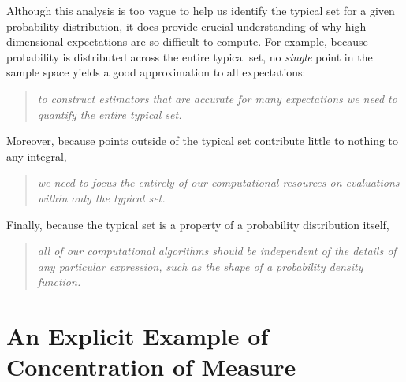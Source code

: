 Although this analysis is too vague to help us identify the typical set
for a given probability distribution, it does provide crucial understanding 
of why high-dimensional expectations are so difficult to compute.  For 
example, because probability is distributed across the entire typical set, 
no \emph{single} point in the sample space yields a good approximation 
to all expectations:
%
\begin{quote}
\emph{to construct estimators that are accurate for many expectations 
we need to quantify the entire typical set.}
\end{quote}
%
Moreover, because points outside of the typical set contribute little to 
nothing to any integral,
%
\begin{quote}
\emph{we need to focus the entirely of our computational resources on 
evaluations within only the typical set.}
\end{quote}
%  
Finally, because the typical set is a property of a probability distribution 
itself,
%
\begin{quote}
\emph{all of our computational algorithms should be independent of the 
details of any particular expression, such as the shape of a probability 
density function.}
\end{quote}

\section{An Explicit Example of Concentration of Measure}

